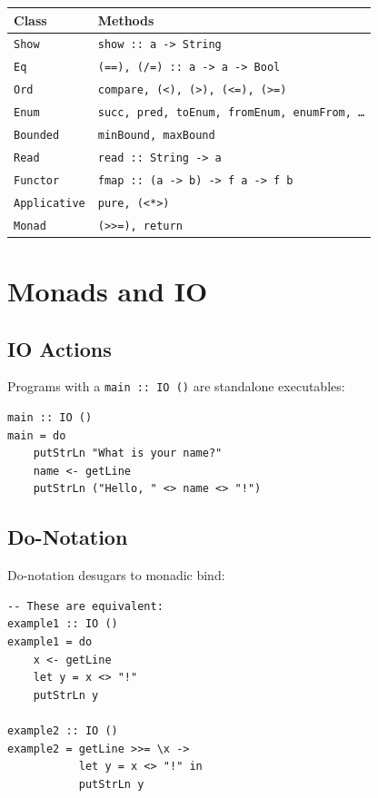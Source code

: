 \documentclass[11pt,a4paper]{article}
\begin{document}
\begin{tabular}{@{}ll@{}}
\toprule
\textbf{Class} & \textbf{Methods} \\
\midrule
\texttt{Show}        & \texttt{show :: a -> String} \\
\texttt{Eq}          & \texttt{(==), (/=) :: a -> a -> Bool} \\
\texttt{Ord}         & \texttt{compare, (<), (>), (<=), (>=)} \\
\texttt{Enum}        & \texttt{succ, pred, toEnum, fromEnum, enumFrom, \ldots} \\
\texttt{Bounded}     & \texttt{minBound, maxBound} \\
\texttt{Read}        & \texttt{read :: String -> a} \\
\texttt{Functor}     & \texttt{fmap :: (a -> b) -> f a -> f b} \\
\texttt{Applicative} & \texttt{pure, (<*>)} \\
\texttt{Monad}       & \texttt{(>>=), return} \\
\bottomrule
\end{tabular}

\section{Monads and IO}

\subsection{IO Actions}

Programs with a \texttt{main :: IO ()} are standalone executables:

\begin{lstlisting}
main :: IO ()
main = do
    putStrLn "What is your name?"
    name <- getLine
    putStrLn ("Hello, " <> name <> "!")
\end{lstlisting}

\subsection{Do-Notation}

Do-notation desugars to monadic bind:

\begin{lstlisting}
-- These are equivalent:
example1 :: IO ()
example1 = do
    x <- getLine
    let y = x <> "!"
    putStrLn y

example2 :: IO ()
example2 = getLine >>= \x ->
           let y = x <> "!" in
           putStrLn y
\end{lstlisting}
\end{document}
